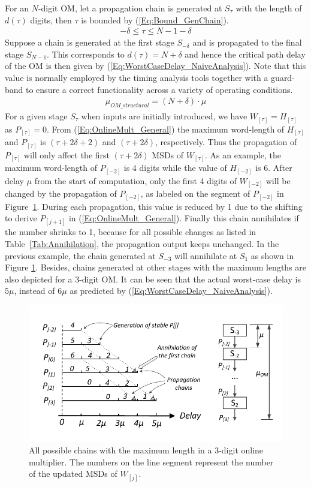 \documentclass{acm_proc_article-sp}
\begin{document}
For an $N$-digit OM, let a propagation chain is generated at $S_{\tau}$ with the length of $d(\tau)$ digits, then $\tau$ is bounded by (\ref{Eq:Bound_GenChain}).
%
\begin{eqnarray}\label{Eq:Bound_GenChain}
  -\delta\leqslant\tau\leqslant N-1-\delta
\end{eqnarray}
%
Suppose a chain is generated at the first stage $S_{-\delta}$ and is propagated to the final stage $S_{N-1}$. This corresponds to $d(\tau)=N+\delta$ and hence the critical path delay of the OM is then given by (\ref{Eq:WorstCaseDelay_NaiveAnalysis}). Note that this value is normally employed by the timing analysis tools together with a guard-band to ensure a correct functionality across a variety of operating conditions.
%
\begin{eqnarray}\label{Eq:WorstCaseDelay_NaiveAnalysis}
  \mu_{OM\_structural} = (N+\delta)\cdot \mu
\end{eqnarray}
%
For a given stage $S_\tau$ when inputs are initially introduced, we have $W_{[\tau]}=H_{[\tau]}$ as $P_{[\tau]}=0$. From (\ref{Eq:OnlineMult_General}) the maximum word-length of $H_{[\tau]}$ and $P_{[\tau]}$ is $(\tau+2\delta+2)$ and $(\tau+2\delta)$, respectively. Thus the propagation of $P_{[\tau]}$ will only affect the first $(\tau+2\delta)$ MSDs of $W_{[\tau]}$. As an example, the maximum word-length of $P_{[-2]}$ is 4 digits while the value of $H_{[-2]}$ is 6. After delay $\mu$ from the start of computation, only the first 4 digits of $W_{[-2]}$ will be changed by the propagation of $P_{[-2]}$, as labeled on the segment of $P_{[-2]}$ in Figure~\ref{Fig:TimingGraph_OM}. During each propagation, this value is reduced by 1 due to the shifting to derive $P_{[j+1]}$ in (\ref{Eq:OnlineMult_General}). Finally this chain annihilates if the number shrinks to 1, because for all possible changes as listed in Table~\ref{Tab:Annihilation}, the propagation output keeps unchanged. In the previous example, the chain generated at $S_{-3}$ will annihilate at $S_1$ as shown in Figure \ref{Fig:TimingGraph_OM}. Besides, chains generated at other stages with the maximum lengths are also depicted for a 3-digit OM. It can be seen that the actual worst-case delay is $5\mu$, instead of $6\mu$ as predicted by (\ref{Eq:WorstCaseDelay_NaiveAnalysis}).
%
\begin{figure}[tbp]
\centering
\includegraphics[width=.5\textwidth]{./Figures/Timing_3DigitOM.pdf}
\vspace{-5ex}
\caption{All possible chains with the maximum length in a 3-digit online multiplier. The numbers on the line segment represent the number of the updated MSDs of $W_{[j]}$.}
\label{Fig:TimingGraph_OM}
\end{figure}
\end{document}
